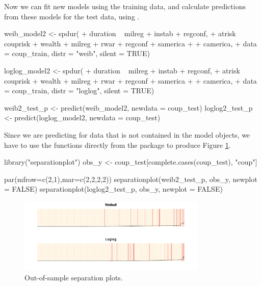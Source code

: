 
Now we can fit new models using the training data, and calculate
predictions from these models for the test data, using
.

\begin{example}
  weib_model2   <- spdur(
  +    duration ~ milreg + instab + regconf,
  +    atrisk ~ couprisk + wealth + milreg + rwar + regconf + samerica + 
  +      camerica,
  +    data = coup_train, distr = "weib", silent = TRUE)

  loglog_model2 <- spdur(
  +    duration ~ milreg + instab + regconf,
  +    atrisk ~ couprisk + wealth + milreg + rwar + regconf + samerica + 
  +      camerica,
  +    data = coup_train, distr = "loglog", silent = TRUE) 
\end{example}

\begin{example}
  weib2_test_p   <- predict(weib_model2, newdata = coup_test)
  loglog2_test_p <- predict(loglog_model2, newdata = coup_test)
\end{example}

Since we are predicting for data that is not contained in the 
model objects, we have to use the  functions
directly from the package to produce Figure \ref{oos-sepplots}.

\begin{example}
  library("separationplot")
  obs_y <- coup_test[complete.cases(coup_test), "coup"]

  par(mfrow=c(2,1),mar=c(2,2,2,2))
  separationplot(weib2_test_p,   obs_y, newplot = FALSE)
  separationplot(loglog2_test_p, obs_y, newplot = FALSE)
\end{example}

\begin{figure}[htbp!]
\begin{center}
\includegraphics[width=0.8\textwidth]{graphics/oos-sepplots.pdf}
\caption{Out-of-sample separation plots.}
\label{oos-sepplots}
\end{center}
\end{figure}

